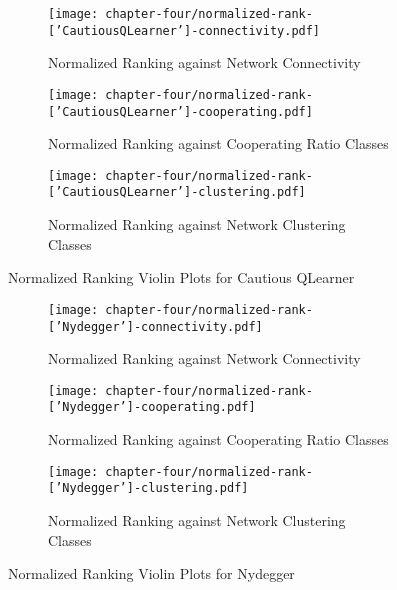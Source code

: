 \begin{figure}[!hbtp]
	\centering
	\begin{subfigure}[t]{0.70\textwidth}
		\centering
		\texttt{[image: chapter-four/normalized-rank-['CautiousQLearner']-connectivity.pdf]}
		\caption{Normalized Ranking against Network Connectivity}
	\end{subfigure}
	\hfill
	\begin{subfigure}[t]{0.70\textwidth}\centering
		\centering
		\texttt{[image: chapter-four/normalized-rank-['CautiousQLearner']-cooperating.pdf]}
		\caption{Normalized Ranking against Cooperating Ratio Classes}
	\end{subfigure}
	\hfill
	\begin{subfigure}[t]{0.70\textwidth}\centering
		\centering
		\texttt{[image: chapter-four/normalized-rank-['CautiousQLearner']-clustering.pdf]}
		\caption{Normalized Ranking against Network Clustering Classes}
	\end{subfigure}
	\caption{Normalized Ranking Violin Plots for Cautious QLearner}
	\label{cautious}
\end{figure}

\begin{figure}[!hbtp]
	\centering
	\begin{subfigure}[t]{0.70\textwidth}
		\centering
		\texttt{[image: chapter-four/normalized-rank-['Nydegger']-connectivity.pdf]}
		\caption{Normalized Ranking against Network Connectivity}
	\end{subfigure}
	\hfill
	\begin{subfigure}[t]{0.70\textwidth}\centering
		\centering
		\texttt{[image: chapter-four/normalized-rank-['Nydegger']-cooperating.pdf]}
		\caption{Normalized Ranking against Cooperating Ratio Classes}
	\end{subfigure}
	\hfill
	\begin{subfigure}[t]{0.70\textwidth}\centering
		\centering
		\texttt{[image: chapter-four/normalized-rank-['Nydegger']-clustering.pdf]}
		\caption{Normalized Ranking against Network Clustering Classes}
	\end{subfigure}
	\caption{Normalized Ranking Violin Plots for Nydegger}
	\label{nydegger}
\end{figure}

